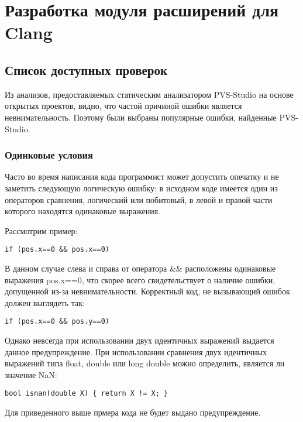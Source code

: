 \chapter{Разработка модуля расширений для Clang}

\section{Список доступных проверок}
Из анализов, предоставляемых статическим анализатором PVS-Studio на основе открытых
проектов, видно, что частой причиной ошибки является невнимательность. Поэтому были выбраны
популярные ошибки, найденные PVS-Studio.

\subsection{Одинковые условия}
\label{sec:eqBin}
Часто во время написания кода программист может допустить опечатку и не заметить следующую
логическую ошибку: в исходном коде имеется один из операторов сравнения, логический или побитовый, в левой 
и правой части которого находятся одинаковые выражения. 

Рассмотрим пример:
\begin{lstlisting}
if (pos.x==0 && pos.x==0)
\end{lstlisting}

В данном случае слева и справа от оператора \&\& расположены одинаковые выражения pos.x==0,
что скорее всего свидетельствует о наличие ошибки, допущенной из-за невнимательности. Корректный код,
не вызывающий ошибок должен выглядеть так:
\begin{lstlisting}
if (pos.x==0 && pos.y==0)
\end{lstlisting}

Однако невсегда при использовании двух идентичных выражений выдается данное предупреждение. 
При использовании сравнения двух идентичных выражений типа float, double или long double можно определить,
является ли значение NaN:
\begin{lstlisting}
bool isnan(double X) { return X != X; }
\end{lstlisting}
Для приведенного выше прмера кода не будет выдано предупреждение.

